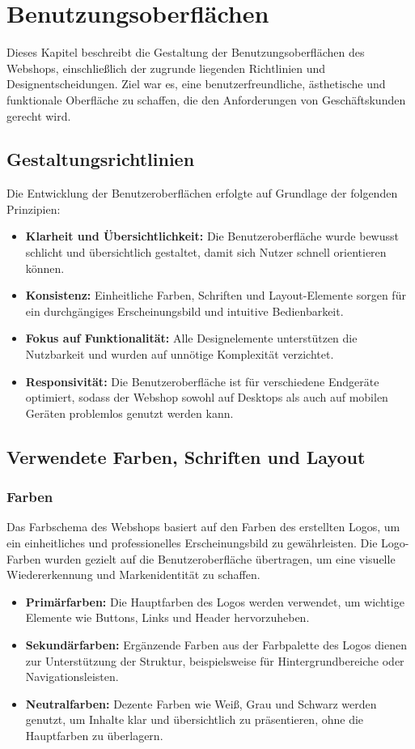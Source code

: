 \documentclass[%
	12pt,
	a4paper,
	oneside,
	parskip=full
]{scrbook}
\begin{document}
\chapter{Benutzungsoberflächen}
Dieses Kapitel beschreibt die Gestaltung der Benutzungsoberflächen des Webshops, einschließlich der zugrunde liegenden Richtlinien und Designentscheidungen. Ziel war es, eine benutzerfreundliche, ästhetische und funktionale Oberfläche zu schaffen, die den Anforderungen von Geschäftskunden gerecht wird.

\section{Gestaltungsrichtlinien}
Die Entwicklung der Benutzeroberflächen erfolgte auf Grundlage der folgenden Prinzipien:
\begin{itemize}
	\item \textbf{Klarheit und Übersichtlichkeit:} Die Benutzeroberfläche wurde bewusst schlicht und übersichtlich gestaltet, damit sich Nutzer schnell orientieren können.
	\item \textbf{Konsistenz:} Einheitliche Farben, Schriften und Layout-Elemente sorgen für ein durchgängiges Erscheinungsbild und intuitive Bedienbarkeit.
	\item \textbf{Fokus auf Funktionalität:} Alle Designelemente unterstützen die Nutzbarkeit und wurden auf unnötige Komplexität verzichtet.
	\item \textbf{Responsivität:} Die Benutzeroberfläche ist für verschiedene Endgeräte optimiert, sodass der Webshop sowohl auf Desktops als auch auf mobilen Geräten problemlos genutzt werden kann.
\end{itemize}

\section{Verwendete Farben, Schriften und Layout}
\subsection{Farben}
Das Farbschema des Webshops basiert auf den Farben des erstellten Logos, um ein einheitliches und professionelles Erscheinungsbild zu gewährleisten. Die Logo-Farben wurden gezielt auf die Benutzeroberfläche übertragen, um eine visuelle Wiedererkennung und Markenidentität zu schaffen.

\begin{itemize}
	\item \textbf{Primärfarben:} Die Hauptfarben des Logos werden verwendet, um wichtige Elemente wie Buttons, Links und Header hervorzuheben.
	\item \textbf{Sekundärfarben:} Ergänzende Farben aus der Farbpalette des Logos dienen zur Unterstützung der Struktur, beispielsweise für Hintergrundbereiche oder Navigationsleisten.
	\item \textbf{Neutralfarben:} Dezente Farben wie Weiß, Grau und Schwarz werden genutzt, um Inhalte klar und übersichtlich zu präsentieren, ohne die Hauptfarben zu überlagern.
\end{itemize}
\end{document}
